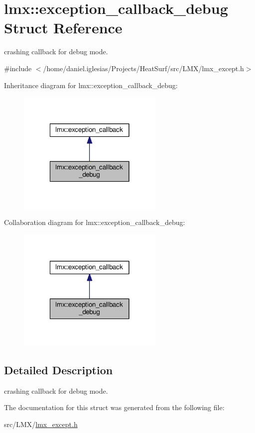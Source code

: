 \hypertarget{structlmx_1_1exception__callback__debug}{\section{lmx\-:\-:exception\-\_\-callback\-\_\-debug Struct Reference}
\label{structlmx_1_1exception__callback__debug}
}


crashing callback for debug mode.  




{\ttfamily \#include $<$/home/daniel.\-iglesias/\-Projects/\-Heat\-Surf/src/\-L\-M\-X/lmx\-\_\-except.\-h$>$}



Inheritance diagram for lmx\-:\-:exception\-\_\-callback\-\_\-debug\-:
\nopagebreak
\begin{figure}[H]
\begin{center}
\leavevmode
\includegraphics[width=198pt]{structlmx_1_1exception__callback__debug__inherit__graph}
\end{center}
\end{figure}


Collaboration diagram for lmx\-:\-:exception\-\_\-callback\-\_\-debug\-:
\nopagebreak
\begin{figure}[H]
\begin{center}
\leavevmode
\includegraphics[width=198pt]{structlmx_1_1exception__callback__debug__coll__graph}
\end{center}
\end{figure}


\subsection{Detailed Description}
crashing callback for debug mode. 

The documentation for this struct was generated from the following file\-:\begin{DoxyCompactItemize}
\item 
src/\-L\-M\-X/\hyperlink{lmx__except_8h}{lmx\-\_\-except.\-h}\end{DoxyCompactItemize}
